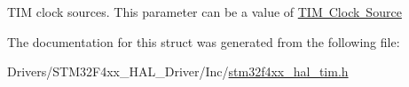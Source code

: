 T\+IM clock sources. This parameter can be a value of \mbox{\hyperlink{group___t_i_m___clock___source}{T\+IM Clock Source}} 

The documentation for this struct was generated from the following file\+:\begin{DoxyCompactItemize}
\item 
Drivers/\+S\+T\+M32\+F4xx\+\_\+\+H\+A\+L\+\_\+\+Driver/\+Inc/\mbox{\hyperlink{stm32f4xx__hal__tim_8h}{stm32f4xx\+\_\+hal\+\_\+tim.\+h}}\end{DoxyCompactItemize}
